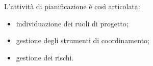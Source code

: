  L'attività di pianificazione è così articolata:
\begin{itemize}
	\item{individuazione dei ruoli di progetto;}
	\item{gestione degli strumenti di coordinamento;}
	\item{gestione dei rischi.}
\end{itemize}